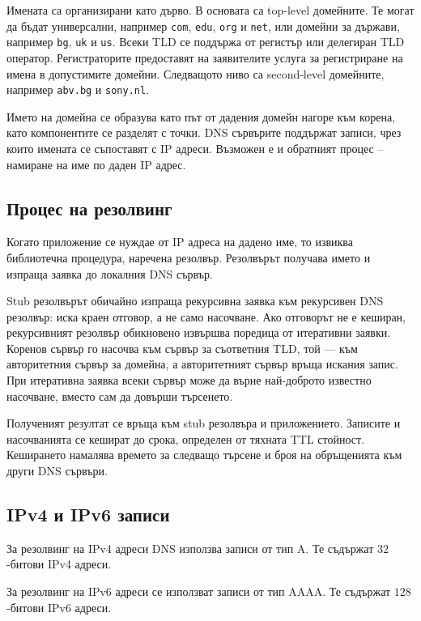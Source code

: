Имената са организирани като дърво. В основата са top-level домейните. Те могат да бъдат универсални, например \verb|com|, \verb|edu|, \verb|org| и \verb|net|, или домейни за държави, например \verb|bg|, \verb|uk| и \verb|us|. Всеки TLD се поддържа от регистър или делегиран TLD оператор. Регистраторите предоставят на заявителите услуга за регистриране на имена в допустимите домейни. Следващото ниво са second-level домейните, например \verb|abv.bg| и \verb|sony.nl|.

Името на домейна се образува като път от дадения домейн нагоре към корена, като компонентите се разделят с точки. DNS сървърите поддържат записи, чрез които имената се съпоставят с IP адреси. Възможен е и обратният процес -- намиране на име по даден IP адрес.

\subsection{Процес на резолвинг}\label{s:13.7.1}

Когато приложение се нуждае от IP адреса на дадено име, то извиква библиотечна процедура, наречена резолвър. Резолвърът получава името и изпраща заявка до локалния DNS сървър.

Stub резолвърът обичайно изпраща рекурсивна заявка към рекурсивен DNS резолвър: иска краен отговор, а не само насочване. Ако отговорът не е кеширан, рекурсивният резолвър обикновено извършва поредица от итеративни заявки. Коренов сървър го насочва към сървър за съответния TLD, той --- към авторитетния сървър за домейна, а авторитетният сървър връща искания запис. При итеративна заявка всеки сървър може да върне най-доброто известно насочване, вместо сам да довърши търсенето.

Полученият резултат се връща към stub резолвъра и приложението. Записите и насочванията се кешират до срока, определен от тяхната TTL стойност. Кеширането намалява времето за следващо търсене и броя на обръщенията към други DNS сървъри.

\subsection{IPv4 и IPv6 записи}\label{s:13.7.2}

\begin{defn}
За резолвинг на IPv4 адреси DNS използва записи от тип A. Те съдържат $32$-битови IPv4 адреси.
\end{defn}

\begin{defn}
За резолвинг на IPv6 адреси се използват записи от тип AAAA. Те съдържат $128$-битови IPv6 адреси.
\end{defn}

